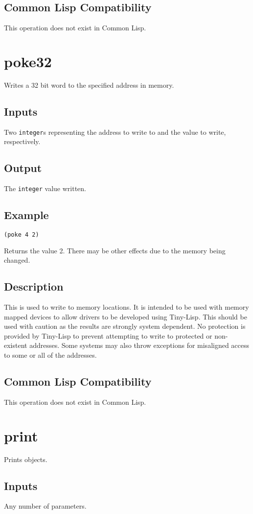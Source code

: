\documentclass[10pt, openany]{book}
\newcommand{\datatype}[1]{\texttt{#1}}
\newcommand{\tl}{Tiny-Lisp}
\newcommand{\cl}{Common Lisp}
\begin{document}
\subsection{Common Lisp Compatibility}
This operation does not exist in \cl.

\section{poke32}
Writes a 32 bit word to the specified address in memory.
\subsection{Inputs}
Two \datatype{integer}s representing the address to write to and the value to write, respectively.
\subsection{Output}
The \datatype{integer} value written.
\subsection{Example}
\begin{lstlisting}
(poke 4 2)
\end{lstlisting}
Returns the value 2.  There may be other effects due to the memory being changed.
\subsection{Description}
This is used to write to memory locations.  It is intended to be used with memory mapped devices to allow drivers to be developed using \tl{}.  This should be used with caution as the results are strongly system dependent.  No protection is provided by \tl{} to prevent attempting to write to protected or non-existent addresses.  Some systems may also throw exceptions for misaligned access to some or all of the addresses.
\subsection{Common Lisp Compatibility}
This operation does not exist in \cl.

\section{print}
Prints objects.
\subsection{Inputs}
Any number of parameters.
\end{document}
